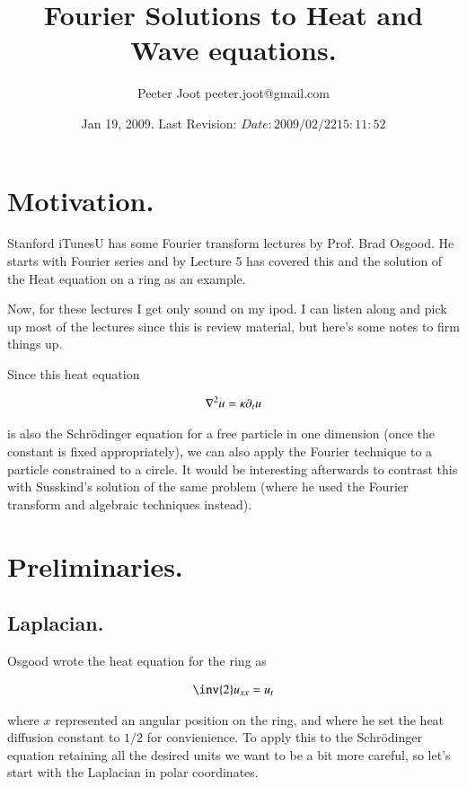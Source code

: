 \documentclass{article}
\title{ Fourier Solutions to Heat and Wave equations. }
\author{Peeter Joot \quad peeter.joot@gmail.com}
\date{ Jan 19, 2009.  Last Revision: $Date: 2009/02/22 15:11:52 $ }
\begin{document}
\maketitle{}


\section{ Motivation. }

Stanford iTunesU has some Fourier transform lectures by Prof. Brad Osgood.
He starts with Fourier series and by Lecture 5 has covered this and
the solution of the Heat equation on a ring as an example.

Now, for these lectures I get only sound on my ipod.  I can listen along and
pick up most of the lectures since this is review material, but here's some
notes to firm things up.

Since this heat equation

\begin{align}
\nabla^2 u = \kappa \partial_t u
\end{align}

is also the Schr\"{o}dinger equation for a free particle in one 
dimension (once the 
constant is fixed appropriately), we can also apply the Fourier
technique to a particle
constrained to a circle.  It would be interesting afterwards to 
contrast this with Susskind's solution of the
same problem (where he used the Fourier transform and algebraic techniques
instead).

\section{ Preliminaries. }

\subsection{ Laplacian. }

Osgood wrote the heat equation for the ring as

\begin{align*}
\inv{2} u_{xx} = u_t
\end{align*}

where $x$ represented an angular position on the ring, and where
he set the heat diffusion constant to $1/2$ for convienience.
To apply this to the Schr\"{o}dinger equation retaining all the desired
units we want to be a bit more careful, so let's start with the Laplacian
in polar coordinates.
\end{document}
